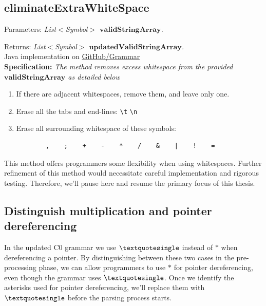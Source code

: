 \vspace{10pt}

\subsection{eliminateExtraWhiteSpace}

Parameters: \textit{List\(<\)Symbol\(>\) \(\boldsymbol{validStringArray}\).}

Returns: \textit{List\(<\)Symbol\(>\) \(\boldsymbol{updatedValidStringArray}\).}\\

Java implementation on \href{https://github.com/fyfsb/dcfg/blob/main/src/main/java/grammar/Grammar.java}{GitHub/Grammar}\\

\textbf{Specification:} \textit{The method removes excess whitespace from the provided \(\boldsymbol{validStringArray}\) as detailed below}\\

\begin{enumerate}
    \item If there are adjacent whitespaces, remove them, and leave only one.
    \item Erase all the tabs and end-lines: \texttt{\textbackslash  t} \texttt{\textbackslash  n}
    \item Erase all surrounding whitespace of these symbols:
    \begin{verbatim}
        ,    ;    +    -    *    /    &    |    !    =
    \end{verbatim}
\end{enumerate}

This method offers programmers some flexibility when using whitespaces. Further refinement of this method would necessitate careful implementation and rigorous testing. Therefore, we'll pause here and resume the primary focus of this thesis.

\vspace{30pt}

\subsection{Distinguish multiplication and pointer dereferencing}

In the updated C0 grammar we use \(\textquotesingle\) instead of \(\ast\) when dereferencing a pointer. By distinguishing between these two cases in the pre-processing phase, we can allow programmers to use \(\ast\) for pointer dereferencing, even though the grammar uses \(\textquotesingle\). Once we identify the asterisks used for pointer dereferencing, we'll replace them with \(\textquotesingle\) before the parsing process starts.\\

